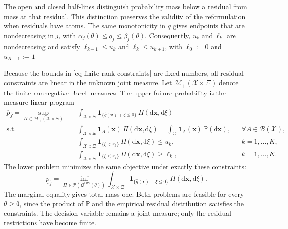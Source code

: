 The open and closed half-lines distinguish probability mass below a residual from mass at that residual. This distinction preserves the validity of the reformulation when residuals have atoms. The same monotonicity in $q$ gives endpoints that are nondecreasing in $j$, with $\alpha_j(\theta)\le q_j\le\beta_j(\theta)$. Consequently, $u_k$ and $\ell_k$ are nondecreasing and satisfy $\ell_{k-1}\le u_k$ and $\ell_k\le u_{k+1}$, with $\ell_0:=0$ and $u_{K+1}:=1$.

Because the bounds in \eqref{eq-finite-rank-constraints} are fixed numbers, all residual constraints are linear in the unknown joint measure. Let $\mathcal M_+(\mathcal X\times\Xi)$ denote the finite nonnegative Borel measures. The upper failure probability is the measure linear program
\begin{equation}
  \begin{aligned}
    \overline p_{\hat f}
    =\sup_{\Pi\in\mathcal M_+(\mathcal X\times\Xi)}\quad&
    \int_{\mathcal X\times\Xi}
    \mathbf1_{\{\hat g(\bm x)+\xi\le0\}}\,\Pi\left(\mathrm d\bm x,\mathrm d\xi\right)\\
    \text{s.t.}\quad&
    \int_{\mathcal X\times\Xi}\mathbf1_A(\bm x)\,\Pi\left(\mathrm d\bm x,\mathrm d\xi\right)
    =\int_{\mathcal X}\mathbf1_A(\bm x)\,\mathbb P\left(\mathrm d\bm x\right),
    &&\forall A\in\mathcal B(\mathcal X),\\
    &\int_{\mathcal X\times\Xi}\mathbf1_{\{\xi<r_k\}}\,\Pi\left(\mathrm d\bm x,\mathrm d\xi\right)\le u_k,
    &&k=1,\ldots,K,\\
    &\int_{\mathcal X\times\Xi}\mathbf1_{\{\xi\le r_k\}}\,\Pi\left(\mathrm d\bm x,\mathrm d\xi\right)\ge\ell_k,
    &&k=1,\ldots,K.
  \end{aligned}
  \label{eq-measure-upper}
\end{equation}
The lower problem minimizes the same objective under exactly these constraints:
\begin{equation}
  \underline p_{\hat f}
  =\inf_{\Pi\in\mathscr P\left(\mathscr Q^{\mathrm{DW}}(\theta)\right)}
  \int_{\mathcal X\times\Xi}\mathbf1_{\{\hat g(\bm x)+\xi\le0\}}\,\Pi\left(\mathrm d\bm x,\mathrm d\xi\right).
  \label{eq-measure-lower}
\end{equation}
The marginal equality gives total mass one. Both problems are feasible for every $\theta\ge0$, since the product of $\mathbb P$ and the empirical residual distribution satisfies the constraints. The decision variable remains a joint measure; only the residual restrictions have become finite.

